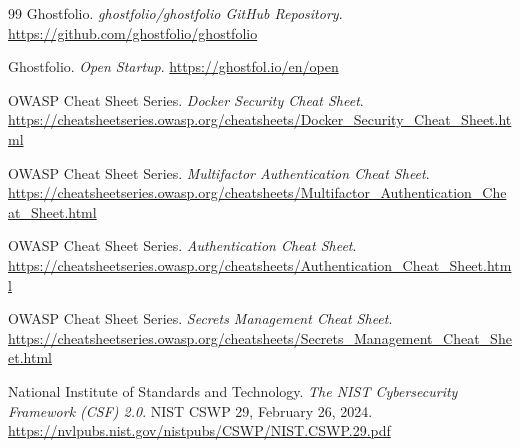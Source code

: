 \documentclass[11pt]{article}
\begin{document}
\begin{thebibliography}{99}
 Ghostfolio. \emph{ghostfolio/ghostfolio GitHub Repository}. \url{https://github.com/ghostfolio/ghostfolio}

 Ghostfolio. \emph{Open Startup}. \url{https://ghostfol.io/en/open}

 OWASP Cheat Sheet Series. \emph{Docker Security Cheat Sheet}. \url{https://cheatsheetseries.owasp.org/cheatsheets/Docker_Security_Cheat_Sheet.html}

 OWASP Cheat Sheet Series. \emph{Multifactor Authentication Cheat Sheet}. \url{https://cheatsheetseries.owasp.org/cheatsheets/Multifactor_Authentication_Cheat_Sheet.html}

 OWASP Cheat Sheet Series. \emph{Authentication Cheat Sheet}. \url{https://cheatsheetseries.owasp.org/cheatsheets/Authentication_Cheat_Sheet.html}

 OWASP Cheat Sheet Series. \emph{Secrets Management Cheat Sheet}. \url{https://cheatsheetseries.owasp.org/cheatsheets/Secrets_Management_Cheat_Sheet.html}

 National Institute of Standards and Technology. \emph{The NIST Cybersecurity Framework (CSF) 2.0}. NIST CSWP 29, February 26, 2024. \url{https://nvlpubs.nist.gov/nistpubs/CSWP/NIST.CSWP.29.pdf}

\end{thebibliography}
\end{document}

